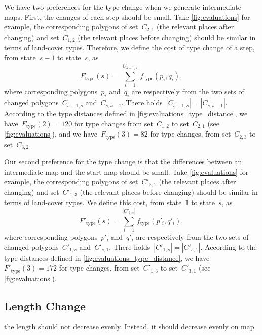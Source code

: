 \documentclass[ijgi,article,submit,moreauthors,pdftex]{Definitions/mdpi}
\begin{document}
We have two preferences for the type change when we generate intermediate maps.
First, the changes of each step should be small.
Take \fig\ref{fig:evaluations} for example, the corresponding polygons of
set~$C_{2,1}$ (the relevant places after  changing) and 
set~$C_{1,2}$ (the relevant places before changing)
should be similar in terms of land-cover types.
Therefore, we define the cost of type change of a step,
from state~$s-1$ to state~$s$, as
\begin{equation}
\label{eq:F_type}
F_\mathrm{type}(s)=\sum_{i=1}^{|C_{s-1,s}|} f_\mathrm{type}(p_i,q_i),
\end{equation}
where corresponding polygons~$p_i$ and~$q_i$ are respectively from 
the two sets of changed polygons~$C_{s-1,s}$ and~$C_{s,s-1}$.
There holds~$|C_{s-1,s}| = |C_{s,s-1}|$.
According to the type distances defined in \fig\ref{fig:evaluations_type_distance},
we have~$F_\mathrm{type}(2)=120$
for type changes from set~$C_{1,2}$ to set~$C_{2,1}$ 
(see \fig\ref{fig:evaluations}), and
we have~$F_\mathrm{type}(3)=82$
for type changes, from set~$C_{2,3}$ to set~$C_{3,2}$.


Our second preference for the type change is that 
the differences between an intermediate map and the start map
should be small.
Take \fig\ref{fig:evaluations} for example, the corresponding polygons of
set~$C'_{3,1}$ (the relevant places after  changing) and 
set~$C'_{1,3}$ (the relevant places before changing)
should be similar in terms of land-cover types.
We define this cost, from state~$1$ to state~$s$, as
\begin{equation}
\label{eq:F_type_prime}
F'_\mathrm{type}(s)=\sum_{i=1}^{|C'_{1,s}|} f_\mathrm{type}(p'_i,q'_i),
\end{equation}
where corresponding polygons~$p'_i$ and~$q'_i$ are respectively from 
the two sets of changed polygons~$C'_{1,s}$ and~$C'_{s,1}$.
There holds~$|C'_{1,s}| = |C'_{s,1}|$.
According to the type distances defined in \fig\ref{fig:evaluations_type_distance},
we have~$F'_\mathrm{type}(3)=172$
for type changes, from set~$C'_{1,3}$ to set~$C'_{3,1}$
(see \fig\ref{fig:evaluations}).

\subsection{Length Change}

{\color{red}the length should not decrease evenly. 
Instead, it should decrease evenly on map.}
\end{document}
